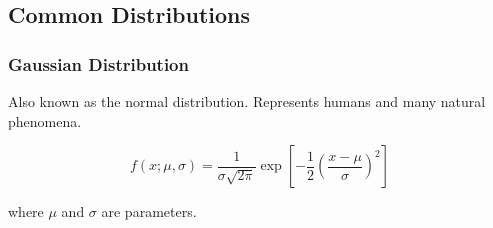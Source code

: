 \subsection{Common Distributions}

\subsubsection{Gaussian Distribution}

Also known as the normal distribution. Represents humans and many natural phenomena.

\begin{equation*}
    f(x; \mu, \sigma) = \frac{1}{\sigma \sqrt{2\pi}} \exp\left[-\frac{1}{2}\left(\frac{x-\mu}{\sigma}\right)^2\right]
\end{equation*}

where $\mu$ and $\sigma$ are parameters.

